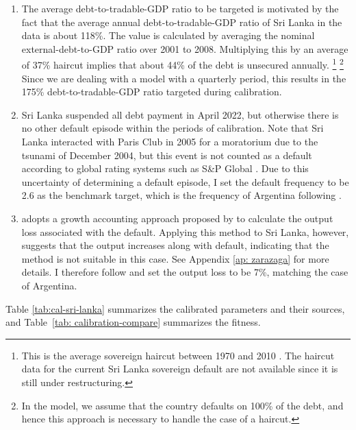 \begin{enumerate}[label = (\roman*)]
    \item
    The average debt-to-tradable-GDP ratio to be targeted is motivated by the fact that the average annual debt-to-tradable-GDP ratio of Sri Lanka in the data is about 118\%.
    The value is calculated by averaging the nominal external-debt-to-GDP ratio over 2001 to 2008.\footnotemark{}
    Multiplying this by an average of 37\% haircut implies that about 44\% of the debt is unsecured annually.%
    \footnote{
        This is the average sovereign haircut between 1970 and 2010 \citep{Cruces-Trebesch-13}. The haircut data for the current Sri Lanka sovereign default are not available since it is still under restructuring.
        }%
    \footnote{
        In the model, we assume that the country defaults on 100\% of the debt, and hence this approach is necessary to handle the case of a haircut.
        }
    Since we are dealing with a model with a quarterly period, this results in the 175\% debt-to-tradable-GDP ratio targeted during calibration.
    \item
    Sri Lanka suspended all debt payment in April 2022, but otherwise there is no other default episode within the periods of calibration. Note that Sri Lanka interacted with Paris Club in 2005 for a moratorium due to the tsunami of December 2004, but this event is not counted as a default according to global rating systems such as S\&P Global \citep{SPGlobal-default-report}.
    Due to this uncertainty of determining a default episode, I set the default frequency to be 2.6 as the benchmark target, which is the frequency of Argentina following \citet{Na-18}.
    \item  \citet{Na-18} adopts a growth accounting approach proposed by \citet{zarazaga-12} to calculate the output loss associated with the default. Applying this method to Sri Lanka, however, suggests that the output increases along with default, indicating that the method is not suitable in this case. See Appendix \ref{ap: zarazaga} for more details. I therefore follow \citet{Na-18} and set the output loss to be 7\%, matching the case of Argentina.
\end{enumerate}
Table \ref{tab:cal-sri-lanka} summarizes the calibrated parameters and their sources, and Table~\ref{tab: calibration-compare} summarizes the fitness.


